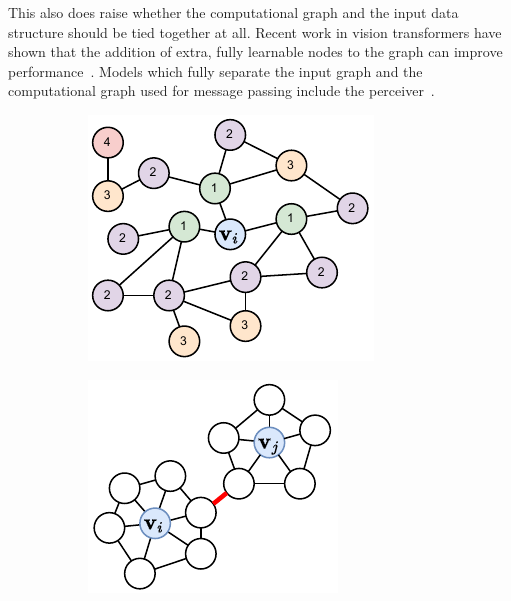 This also does raise whether the computational graph and the input data structure should be tied together at all.
Recent work in vision transformers have shown that the addition of extra, fully learnable nodes to the graph can improve performance~.
Models which fully separate the input graph and the computational graph used for message passing include the perceiver~.

\begin{figure}
    \centering
    \begin{subfigure}[b]{0.3\textwidth}
        \centering
        \includegraphics[width=\textwidth]{Figures/transformers/neighbours.pdf}
        \caption{}
        \label{fig:neighbours}
    \end{subfigure}
    \begin{subfigure}[b]{0.3\textwidth}
        \centering
        \includegraphics[width=\textwidth]{Figures/transformers/bottleneck.pdf}

\end{subfigure}
\end{figure}
